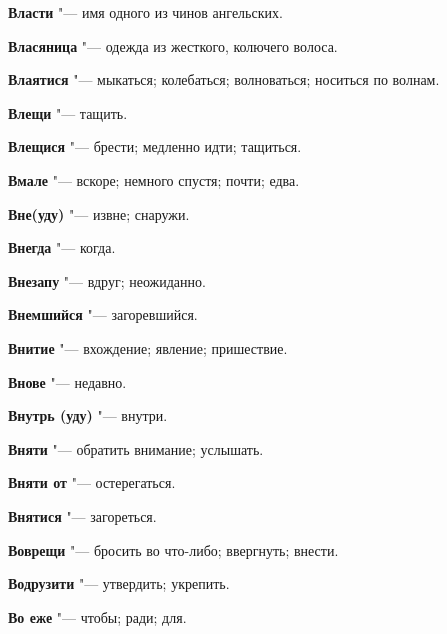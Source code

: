 \begin{mymulticols}{2}
\noindent\textbf{Власти} "--- имя одного из чинов ангельских. 




\noindent\textbf{Власяница} "--- одежда из жесткого, колючего волоса. 




\noindent\textbf{Влаятися} "--- мыкаться; колебаться; волноваться; носиться по волнам. 




\noindent\textbf{Влещи} "--- тащить. 




\noindent\textbf{Влещися} "--- брести; медленно идти; тащиться. 




\noindent\textbf{Вмале} "--- вскоре; немного спустя; почти; едва. 




\noindent\textbf{Вне(уду)} "--- извне; снаружи. 




\noindent\textbf{Внегда} "--- когда. 




\noindent\textbf{Внезапу} "--- вдруг; неожиданно. 




\noindent\textbf{Внемшийся} "--- загоревшийся. 




\noindent\textbf{Внитие} "--- вхождение; явление; пришествие. 




\noindent\textbf{Внове} "--- недавно. 




\noindent\textbf{Внутрь (уду)} "--- внутри. 




\noindent\textbf{Вняти} "--- обратить внимание; услышать. 




\noindent\textbf{Вняти от} "--- остерегаться. 




\noindent\textbf{Внятися} "--- загореться. 




\noindent\textbf{Воврещи} "--- бросить во что-либо; ввергнуть; внести. 




\noindent\textbf{Водрузити} "--- утвердить; укрепить. 




\noindent\textbf{Во еже} "--- чтобы; ради; для. 





\end{mymulticols}
